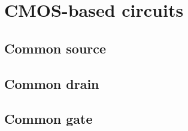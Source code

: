 
\chapter{CMOS-based circuits}



\section{Common source}





\section{Common drain}





\section{Common gate}


	
	
%		
%	
%		
